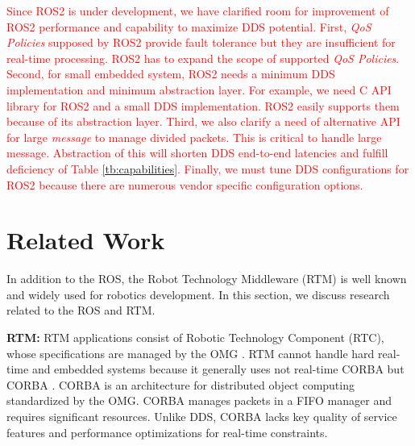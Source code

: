 \documentclass{sig-alternate-05-2015}
\begin{document}
\textcolor{red}{
Since ROS2 is under development, we have clarified room for improvement of ROS2 performance and capability to maximize DDS potential.
First, \emph{QoS Policies} supposed by ROS2 provide fault tolerance but they are insufficient for real-time processing.
ROS2 has to expand the scope of supported \emph{QoS Policies}.
Second, for small embedded system, ROS2 needs a minimum DDS implementation and minimum abstraction layer.
For example, we need C API library for ROS2 and a small DDS implementation.
ROS2 easily supports them because of its abstraction layer.
Third, we also clarify a need of alternative API for large \emph{message} to manage divided packets.
This is critical to handle large message.
Abstraction of this will shorten DDS end-to-end latencies and fulfill deficiency of Table \ref{tb:capabilities}.
Finally, we must tune DDS configurations for ROS2 because there are numerous vendor specific configuration options.
}

\vspace{-3mm}
\section{Related Work}
\label{sec:orgheadline3}

In addition to the ROS, the Robot Technology Middleware (RTM) \cite{ando2005rt} is well known and widely used for robotics development. 
In this section, we discuss research related to the ROS and RTM.

\textbf{RTM:} 
RTM applications consist of Robotic Technology Component (RTC), whose specifications are managed by the OMG \cite{omg}. 
RTM cannot handle hard real-time and embedded systems because it generally uses not real-time CORBA \cite{schmidt1998design} but CORBA \cite{vinoski1997corba}.
CORBA is an architecture for distributed object computing standardized by the OMG.
CORBA manages packets in a FIFO manager and requires significant resources. 
Unlike DDS, CORBA lacks key quality of service features and performance optimizations for real-time constraints.
\end{document}
